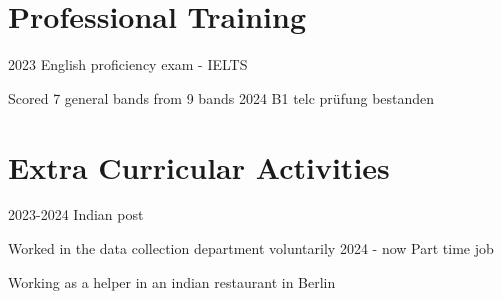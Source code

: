 \documentclass[]{cv-style} %
\begin{document}
\section{Professional Training}
\begin{entrylist}
\entry
{2023}
{English proficiency exam - IELTS}

{Scored 7 general bands from 9 bands}
\entry
{2024}
{B1 telc prüfung bestanden}


\end{entrylist}
\section{Extra Curricular Activities}
\begin{entrylist}
\entry
{2023-2024}
{Indian post}

{Worked in the data collection department voluntarily}
\entry
{2024 - now}
{Part time job }

{Working as a helper in an indian restaurant in Berlin}
\end{entrylist}
\end{document}
